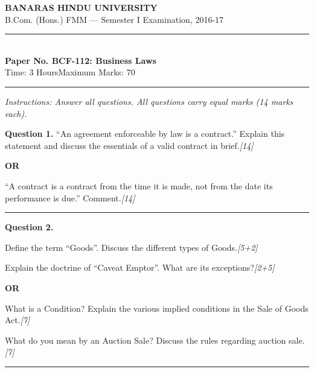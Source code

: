 \documentclass[11pt,a4paper]{article}
\newcommand{\pts}[1]{\hfill   \textit{[#1]}}
\begin{document}
\begin{center}
  {\large\bfseries BANARAS HINDU UNIVERSITY}\\[2pt]
  {\normalsize B.Com. (Hons.) FMM --- Semester I Examination, 2016-17}\\[6pt]
  \rule{0.8\linewidth}{0.5pt}\\[6pt]
  {\large\bfseries Paper No. BCF-112: Business Laws}\\[4pt]
  {\normalsize Time: 3 Hours\hfill Maximum Marks: 70}
\end{center}

\rule{\linewidth}{0.4pt}

\smallskip



\noindent   \textit{Instructions: Answer all questions. All questions carry equal marks (14 marks each).}

\bigskip




\noindent   \textbf{Question 1.}
``An agreement enforceable by law is a contract.'' Explain this statement and discuss the essentials of a valid contract in brief.\pts{14}

\centerline{   \textbf{OR}}

``A contract is a contract from the time it is made, not from the date its performance is due.'' Comment.\pts{14}

\medskip\rule{\linewidth}{0.2pt}




\noindent   \textbf{Question 2.}

\begin{parts}
  \item Define the term ``Goods''. Discuss the different types of Goods.\pts{5+2}
  \item Explain the doctrine of ``Caveat Emptor''. What are its exceptions?\pts{2+5}
\end{parts}

\centerline{   \textbf{OR}}


\begin{parts}
  \item What is a Condition? Explain the various implied conditions in the Sale of Goods Act.\pts{7}
  \item What do you mean by an Auction Sale? Discuss the rules regarding auction sale.\pts{7}
\end{parts}

\medskip\rule{\linewidth}{0.2pt}
\end{document}
